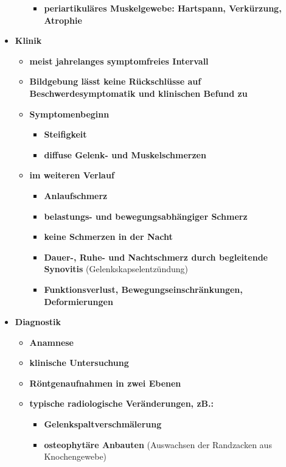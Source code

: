 \begin{itemize}
\begin{itemize}
\begin{itemize}
							\item \textbf{periartikuläres Muskelgewebe: Hartspann, Verkürzung, Atrophie}
						\end{itemize}
				\end{itemize}
			\item \textbf{Klinik}
				\begin{itemize}
					\item \textbf{meist jahrelanges symptomfreies Intervall}
					\item \textbf{Bildgebung lässt keine Rückschlüsse auf Beschwerdesymptomatik und klinischen Befund zu}
					\item \textbf{Symptomenbeginn}
						\begin{itemize}
							\item \textbf{Steifigkeit}
							\item \textbf{diffuse Gelenk- und Muskelschmerzen}
						\end{itemize}
					\item \textbf{im weiteren Verlauf}
						\begin{itemize}
							\item \textbf{Anlaufschmerz}
							\item \textbf{belastungs- und bewegungsabhängiger Schmerz}
							\item \textbf{keine Schmerzen in der Nacht}
							\item \textbf{Dauer-, Ruhe- und Nachtschmerz durch begleitende Synovitis} (Gelenkskapselentzündung)
							\item \textbf{Funktionsverlust, Bewegungseinschränkungen, Deformierungen}
						\end{itemize}
				\end{itemize}
			\item \textbf{Diagnostik}
				\begin{itemize}
					\item \textbf{Anamnese}
					\item \textbf{klinische Untersuchung}
					\item \textbf{Röntgenaufnahmen in zwei Ebenen}
					\item \textbf{typische radiologische Veränderungen, zB.:}
						\begin{itemize}
							\item \textbf{Gelenkspaltverschmälerung}
							\item \textbf{osteophytäre Anbauten} (Auswachsen der Randzacken aus Knochengewebe)
						\end{itemize}

\end{itemize}
\end{itemize}
